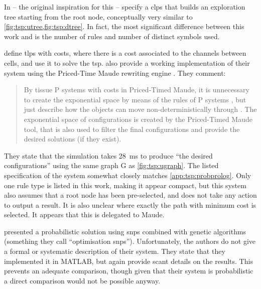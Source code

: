 
In \cite{Guo2017} -- the original inspiration for this  -- \citeauthor{Guo2017} specify a \gls{clps} that builds an exploration tree starting from the root node, conceptually very similar to \cref{fig:tsp:utree,fig:tsp:dtree}.  In fact, the most significant difference between this work and \cite{Guo2017} is the number of rules and number of distinct symbols used.


\citeauthor{Aman2021} \cite{Aman2021} define \gls{tlps} with costs, where there is a cost associated to the channels between cells, and use it to solve the \gls{tsp}.
\citeauthor{Aman2021} also provide a working implementation of their system using the Priced-Time Maude rewriting engine \cite{Bendiksen2009}.  They comment: \blockquote{By  tissue P systems with costs in Priced-Timed Maude, it is unnecessary to create the exponential space by means of the rules of P systems , but just describe how the objects can move non-deterministically through .  The exponential space of configurations is created by \textelp{} the Priced-Timed Maude tool, that is also used to filter the final configurations and provide the desired solutions (if they exist).}
They state that the simulation takes \qty{28}{\milli\second} to produce \enquote{the desired configurations} using the same graph G as \cref{fig:tsp:ugraph}.  The listed specification of the system somewhat closely matches \cref{app:tsp:probprolog}.
Only one rule type is listed in this work, making it appear compact, but this system also assumes that a root node has been pre-selected, and does not take any action to output a result.  It is also unclear where exactly the path with minimum cost is selected.  It appears that this is delegated to Maude.


\citeauthor{Qi2018} \cite{Qi2018} presented a probabilistic solution using \gls{snps} combined with genetic algorithms (something they call ``optimisation \gls{snps}'').  Unfortunately, the authors do not give a formal or systematic description of their system.  They state that they implemented it in MATLAB, but again provide scant details on the results.  This prevents an adequate comparison, though given that their system is probabilistic a direct comparison would not be possible anyway.

